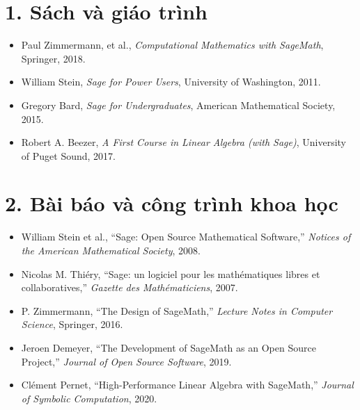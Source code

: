 \section*{1. Sách và giáo trình}
\begin{itemize}
	\item Paul Zimmermann, et al., \textit{Computational Mathematics with SageMath}, Springer, 2018.
	\item William Stein, \textit{Sage for Power Users}, University of Washington, 2011.
	\item Gregory Bard, \textit{Sage for Undergraduates}, American Mathematical Society, 2015.
	\item Robert A. Beezer, \textit{A First Course in Linear Algebra (with Sage)}, University of Puget Sound, 2017.
\end{itemize}

\section*{2. Bài báo và công trình khoa học}
\begin{itemize}
	\item William Stein et al., “Sage: Open Source Mathematical Software,” \textit{Notices of the American Mathematical Society}, 2008.
	\item Nicolas M. Thiéry, “Sage: un logiciel pour les mathématiques libres et collaboratives,” \textit{Gazette des Mathématiciens}, 2007.
	\item P. Zimmermann, “The Design of SageMath,” \textit{Lecture Notes in Computer Science}, Springer, 2016.
	\item Jeroen Demeyer, “The Development of SageMath as an Open Source Project,” \textit{Journal of Open Source Software}, 2019.
	\item Clément Pernet, “High-Performance Linear Algebra with SageMath,” \textit{Journal of Symbolic Computation}, 2020.
\end{itemize}


